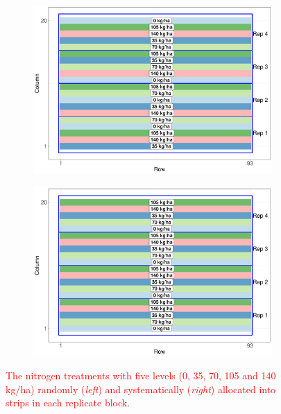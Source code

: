 \documentclass[a4paper]{article} 	%
\newcommand{\revision}[1]{\textcolor{red}{#1}}
\begin{document}
\begin{figure}[!htp]
	\begin{subfigure}[t]{0.45\textwidth}
		\centering
		\includegraphics[width=\linewidth]{Col_RandNitro_V4.pdf}
	\end{subfigure}
	\hspace{0.05\textwidth}
	\begin{subfigure}[t]{0.45\textwidth}
		\centering
		\includegraphics[width=\linewidth]{Col_SystNitro_V4.pdf}
	\end{subfigure}
	\caption{\revision{The nitrogen treatments with five levels (0, 35, 70, 105 and 140 kg/ha) randomly (\textit{left}) and systematically (\textit{right}) allocated into strips in each replicate block.}}\label{fig:Nitrogen}
\end{figure}
\end{document}
